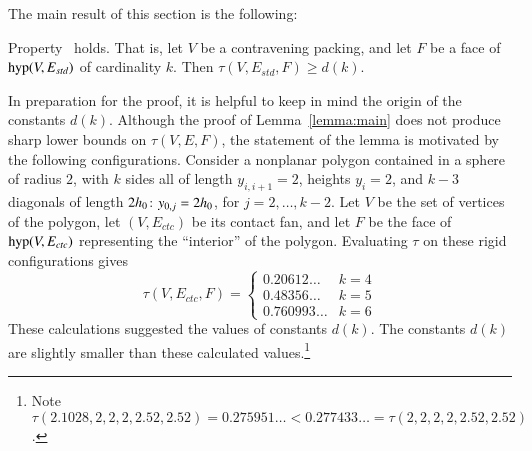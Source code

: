The main result of this section is the following:






\begin{lemma}\label{lemma:main} %
Property~ holds.  That is,
let $V$ be a contravening packing, and  let $F$ be a
face of ${\operatorname{hyp}}(V,E_{std})$ of cardinality $k$.  Then
        $\tau(V,E_{std},F) \ge d(k)$.
\end{lemma}
%
%

\begin{remark}
In preparation for the proof, 
it is helpful to keep in mind the origin of the constants $d(k)$.
Although the proof of Lemma~\ref{lemma:main} does not produce sharp lower bounds on $\tau(V,E,F)$, the
statement of the lemma is motivated by the following configurations.
Consider a nonplanar polygon contained in a sphere of radius $2$, with $k$ sides all of length $y_{i,i+1}=2$, heights
$y_i=2$, and $k-3$ diagonals of length $2{h_0}$: $y_{0,j}=2{h_0}$, for
$j=2,\ldots,k-2$.  Let $V$ be the set of vertices of the polygon, let $(V,E_{ctc})$ be its contact fan, and let $F$ be the face of ${\operatorname{hyp}}(V,E_{ctc})$ representing the ``interior'' of the polygon.  Evaluating $\tau$ on these rigid configurations gives
$$
\tau(V,E_{ctc},F) = \begin{cases}
0.20612\ldots & k=4\\
0.48356\ldots & k=5\\
0.760993\ldots &k=6
\end{cases}
$$
These calculations suggested the values of constants $d(k)$.  The constants $d(k)$ are slightly smaller than these calculated values.\footnote{Note $\tau(2.1028,2,2,2,2.52,2.52) = 0.275951\ldots < 0.277433\ldots = \tau(2,2,2,2,2.52,2.52)$.}
%
%
%
\end{remark}


